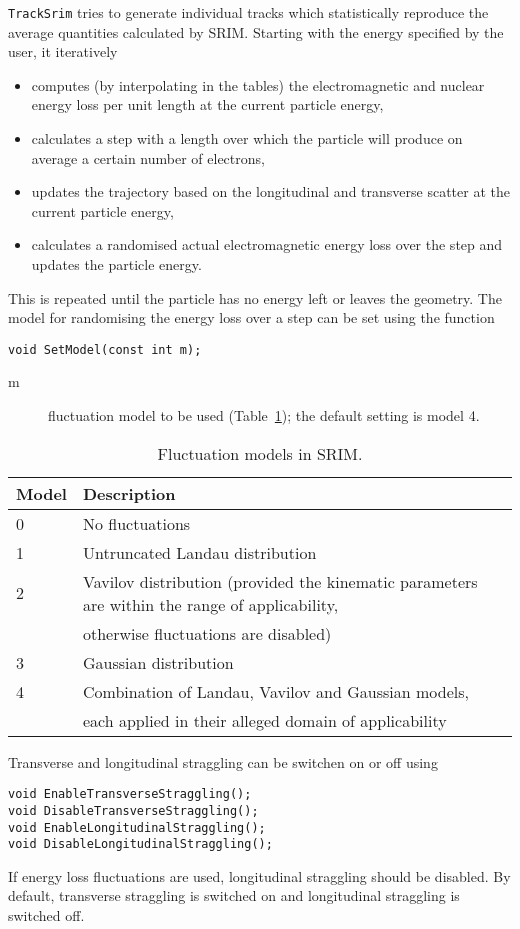 \texttt{TrackSrim} tries to generate individual tracks which statistically 
reproduce the average quantities calculated by SRIM.
Starting with the energy specified by the user, it iteratively
\begin{itemize}
\item
computes (by interpolating in the tables)  
the electromagnetic and nuclear energy loss per unit length at the 
current particle energy,
\item
calculates a step with a length over which the particle will 
produce on average a certain number of electrons,
\item
updates the trajectory based on the longitudinal and transverse scatter 
at the current particle energy,
\item 
calculates a randomised actual electromagnetic energy loss over the step 
and updates the particle energy.
\end{itemize}
This is repeated until the particle has no energy left or leaves the geometry.
The model for randomising the energy loss over a step can be set using 
the function 
\begin{lstlisting}
void SetModel(const int m);
\end{lstlisting}
\begin{description}
\item[m] fluctuation model to be used (Table~\ref{Tab:SrimFluctuationModels}); the default setting is model 4.
\end{description}
\begin{table}
  \centering
  \begin{tabular}{l l}
    \toprule
    Model & Description \\
    \midrule
    0 & No fluctuations \\
    1 & Untruncated Landau distribution \\
    2 & Vavilov distribution (provided the kinematic parameters are within the range of applicability, \\
      & otherwise fluctuations are disabled) \\
    3 & Gaussian distribution \\
    4 & Combination of Landau, Vavilov and Gaussian models, \\
      & each applied in their alleged domain of applicability \\
    \bottomrule
  \end{tabular}
  \caption{Fluctuation models in SRIM.}
  \label{Tab:SrimFluctuationModels}
\end{table}
Transverse and longitudinal straggling can be switchen on or off using
\begin{lstlisting}
void EnableTransverseStraggling();
void DisableTransverseStraggling();
void EnableLongitudinalStraggling();
void DisableLongitudinalStraggling();
\end{lstlisting}
If energy loss fluctuations are used, longitudinal straggling should be disabled.
By default, transverse straggling is switched on and longitudinal straggling 
is switched off. 

